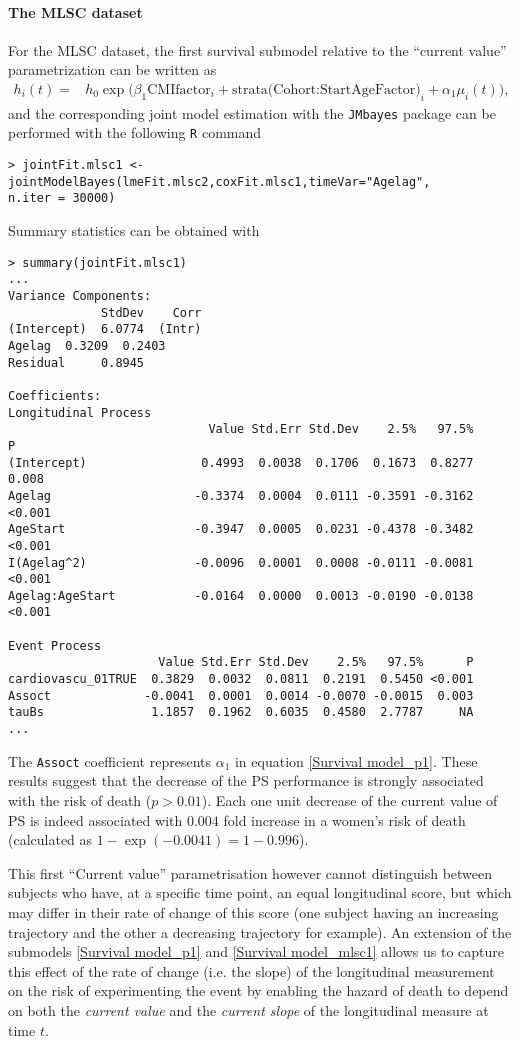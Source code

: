 \documentclass[12pt]{article}
\begin{document}
\paragraph{The MLSC dataset}
For the MLSC dataset, the first survival submodel relative to the ``current value'' parametrization can be written as
\begin{equation}
\begin{split}
h_i(t) = &h_0 \exp \big(\beta_1 \text{CMIfactor}_i + \text{strata(Cohort:StartAgeFactor)}_i  + \alpha_1 \mu_i(t)\big),
\end{split}
\label{Survival model_mlsc1}
\end{equation}
and the corresponding joint model estimation with the \texttt{JMbayes} package can be performed with the following \texttt{R} command
\begin{verbatim}
> jointFit.mlsc1 <-jointModelBayes(lmeFit.mlsc2,coxFit.mlsc1,timeVar="Agelag",
n.iter = 30000)
\end{verbatim}
Summary statistics can be obtained with
\begin{verbatim}
> summary(jointFit.mlsc1)
...
Variance Components:
             StdDev    Corr
(Intercept)  6.0774  (Intr)
Agelag  0.3209  0.2403
Residual     0.8945

Coefficients:
Longitudinal Process
                            Value Std.Err Std.Dev    2.5%   97.5%      P
(Intercept)                0.4993  0.0038  0.1706  0.1673  0.8277  0.008
Agelag                    -0.3374  0.0004  0.0111 -0.3591 -0.3162 <0.001
AgeStart                  -0.3947  0.0005  0.0231 -0.4378 -0.3482 <0.001
I(Agelag^2)               -0.0096  0.0001  0.0008 -0.0111 -0.0081 <0.001
Agelag:AgeStart           -0.0164  0.0000  0.0013 -0.0190 -0.0138 <0.001

Event Process
                     Value Std.Err Std.Dev    2.5%   97.5%      P
cardiovascu_01TRUE  0.3829  0.0032  0.0811  0.2191  0.5450 <0.001
Assoct             -0.0041  0.0001  0.0014 -0.0070 -0.0015  0.003
tauBs               1.1857  0.1962  0.6035  0.4580  2.7787     NA
...
\end{verbatim}
The \texttt{Assoct} coefficient represents $\alpha_1$ in equation \eqref{Survival model_p1}. These results suggest that the decrease of the PS performance is strongly associated with the risk of death ($p>0.01$). Each one unit decrease of the current value of PS is indeed associated with $0.004$ fold increase in a women's risk of death (calculated as $1-\exp (-0.0041)=1-0.996$).

This first ``Current value'' parametrisation however cannot distinguish between subjects who have, at a specific time point, an equal longitudinal score, but which may differ in their rate of change of this score (one subject having an increasing trajectory and the other a decreasing trajectory for example).
An extension of the submodels \eqref{Survival model_p1} and \eqref{Survival model_mlsc1} allows us to capture this effect of the rate of change (i.e. the slope) of the longitudinal measurement on the risk of experimenting the event by enabling the hazard of death to depend on both the \textit{current value} and the \textit{current slope} of the longitudinal measure at time $t$.
\end{document}
